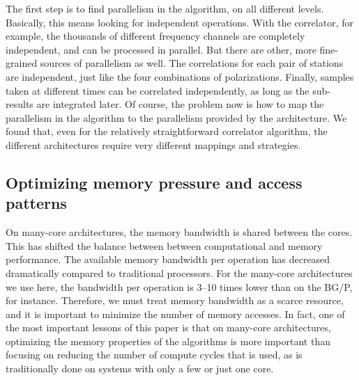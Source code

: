 \documentclass{article}
\begin{document}
The first step is to find parallelism in the algorithm, on all
different levels.  Basically, this means looking for independent
operations.  With the correlator, for example, the thousands of
different frequency channels are completely independent, and can be
processed in parallel. But there are other, more fine-grained sources
of parallelism as well.  The correlations for each pair of stations
are independent, just like the four combinations of  
polarizations.  Finally, samples taken at different times can
be correlated independently, as long as the sub-results are integrated
later. Of course, the problem now is how to map the parallelism in the
algorithm to the parallelism provided by the architecture. We found
that, even for the relatively straightforward correlator algorithm,
the different architectures require very different mappings and
strategies.


\subsection{Optimizing memory pressure and access patterns}

On many-core architectures, the memory bandwidth is shared between the
cores.  This has shifted the balance between between computational and
memory performance.  The available memory bandwidth per operation has
decreased dramatically compared to traditional processors.  For the many-core architectures we use here,
the bandwidth per operation is 3--10 times lower than on the BG/P, for
instance.  Therefore, we must treat memory bandwidth as a scarce
resource, and it is important to minimize the number of memory
accesses.  In fact, one of the most important lessons of this paper is that on
many-core architectures, optimizing the memory properties of the
algorithms is more important than focusing on reducing the number of
compute cycles that is used, as is traditionally done on systems with
only a few or just one core.
\end{document}
